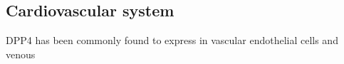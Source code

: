 \subsection{Cardiovascular system}
DPP4 has been commonly found to express in vascular endothelial cells and venous ~